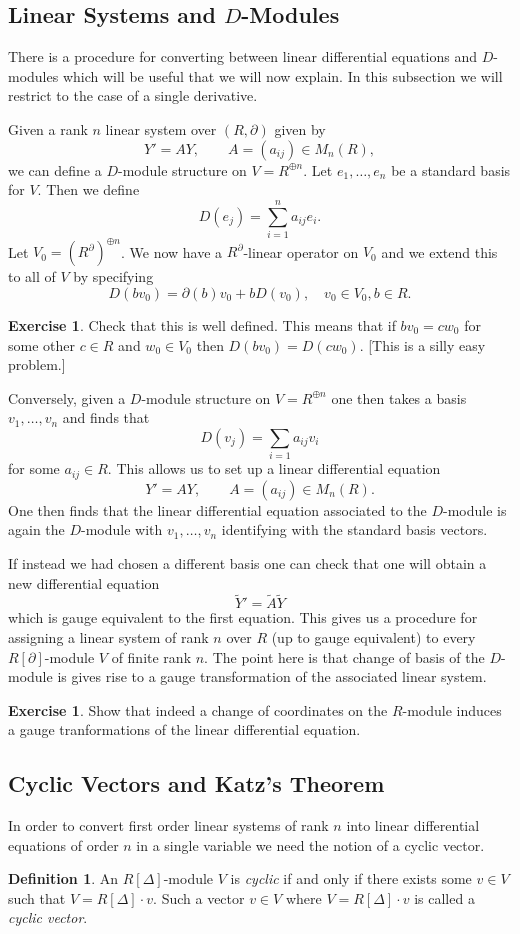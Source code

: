 \documentclass[]{book}
\numberwithin{equation}{section}
\theoremstyle{definition}
\newtheorem{definition}[theorem]{Definition}
\newtheorem{exercise}[theorem]{Exercise}
\theoremstyle{remark}
\begin{document}
\subsection{Linear Systems and $D$-Modules}
There is a procedure for converting between linear differential equations and $D$-modules which will be useful that we will now explain. 
In this subsection we will restrict to the case of a single derivative.

Given a rank $n$ linear system over $(R,\partial)$ given by 
$$ Y' = A Y, \qquad A = (a_{ij}) \in M_n(R), $$
we can define a $D$-module structure on $V=R^{\oplus n}$.
Let $e_1,\ldots,e_n$ be a standard basis for $V$.
Then we define 
$$ D(e_j) = \sum_{i=1}^n a_{ij} e_i.$$
Let $V_0 = (R^{\partial})^{\oplus n}$. 
We now have a $R^{\partial}$-linear operator on $V_0$ and we extend this to all of $V$ by specifying 
$$ D(b v_0) = \partial(b)v_0 + b D(v_0), \quad v_0 \in V_0, b \in R. $$
\begin{exercise}
	Check that this is well defined.
	This means that if $bv_0 = cw_0$ for some other $c \in R$ and $w_0 \in V_0$ then $D(bv_0) = D(cw_0)$. [This is a silly easy problem.]
\end{exercise}

Conversely, given a $D$-module structure on $V = R^{\oplus n}$ one then takes a basis $v_1,\ldots, v_n$ and finds that 
$$ D(v_j) = \sum_{i=1}a_{ij}v_i $$
for some $a_{ij}\in R$. 
This allows us to set up a linear differential equation 
$$ Y' = AY, \qquad A = (a_{ij}) \in M_n(R).$$
One then finds that the linear differential equation associated to the $D$-module is again the $D$-module with $v_1,\ldots,v_n$ identifying with the standard basis vectors. 

If instead we had chosen a different basis one can check that one will obtain a new differential equation
$$ \widetilde{Y}' = \widetilde{A} \widetilde{Y} $$
which is gauge equivalent to the first equation. 
This gives us a procedure for assigning a linear system of rank $n$ over $R$ (up to gauge equivalent) to every $R[\partial]$-module $V$ of finite rank $n$.
The point here is that change of basis of the $D$-module is gives rise to a gauge transformation of the associated linear system.

\begin{exercise}
	Show that indeed a change of coordinates on the $R$-module induces a gauge tranformations of the linear differential equation.
\end{exercise}

\subsection{Cyclic Vectors and Katz's Theorem}
In order to convert first order linear systems of rank $n$ into linear differential equations of  order $n$ in a single variable we need the notion of a cyclic vector. 
\begin{definition}
	An $R[\Delta]$-module $V$ is \emph{cyclic} if and only if there exists some $v \in V$ such that $V = R[\Delta]\cdot v$. 
	Such a vector $v \in V$ where $V = R[\Delta]\cdot v$ is called a \emph{cyclic vector}.
\end{definition}
\end{document}
